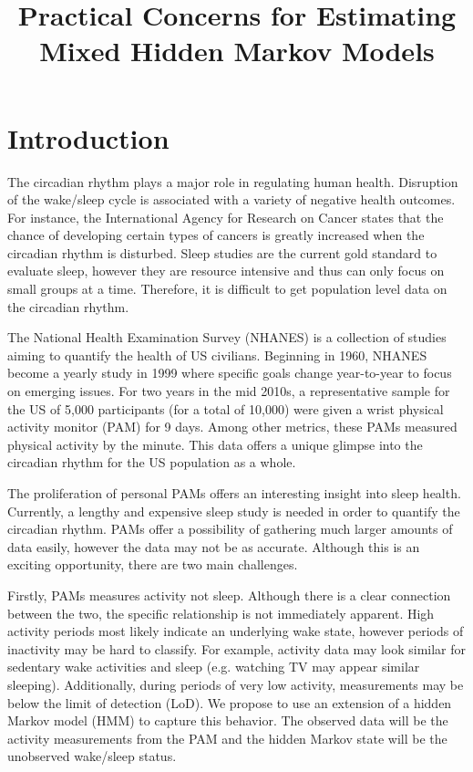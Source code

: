 \documentclass{article}
\title{Practical Concerns for Estimating Mixed Hidden Markov Models}
\author{}
\date{}
\begin{document}
\maketitle

\section{Introduction}

The circadian rhythm plays a major role in regulating human health. 
Disruption of the wake/sleep cycle is associated with a variety of negative health outcomes. 
For instance, the International Agency for Research on Cancer states that the chance of developing 
certain types of cancers is greatly increased when the circadian rhythm is disturbed. 
Sleep studies are the current gold standard to evaluate sleep, however they are resource 
intensive and thus can only focus on small groups at a time. 
Therefore, it is difficult to get population level data on the circadian rhythm. 

The National Health Examination Survey (NHANES) is a collection 
of studies aiming to quantify the health of US civilians. 
Beginning in 1960, NHANES become a yearly study in 1999 where 
specific goals change year-to-year to focus on emerging issues. 
For two years in the mid 2010s, a representative sample for the 
US of 5,000 participants (for a total of 10,000) were 
given a wrist physical activity monitor (PAM) for 9 days. 
Among other metrics, these PAMs measured physical activity by the minute. 
This data offers a unique glimpse into the circadian rhythm for the US population as a whole.

The proliferation of personal PAMs offers an interesting insight into sleep health. 
Currently, a lengthy and expensive sleep study is needed in order to quantify the circadian rhythm. 
PAMs offer a possibility of gathering much larger amounts 
of data easily, however the data may not be as accurate. 
Although this is an exciting opportunity, there are two main challenges. 

Firstly, PAMs measures activity not sleep. Although there is a clear 
connection between the two, the specific relationship is not immediately apparent. 
High activity periods most likely indicate an underlying wake state, 
however periods of inactivity may be hard to classify. For example, 
activity data may look similar for sedentary wake activities 
and sleep (e.g. watching TV may appear similar sleeping). Additionally, 
during periods of very low activity, measurements may be below the limit of detection (LoD). 
We propose to use an extension of a hidden Markov model (HMM) to capture this behavior. 
The observed data will be the activity measurements from the PAM 
and the hidden Markov state will be the unobserved wake/sleep status.
\end{document}
